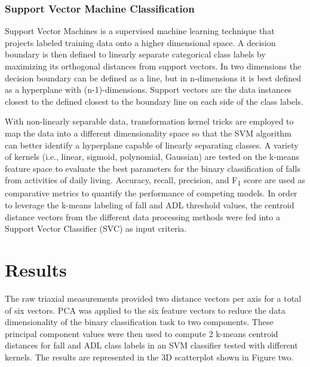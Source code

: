\documentclass{llncs}
\begin{document}
\subsubsection{Support Vector Machine Classification} 
	Support Vector Machines is a supervised machine learning technique that projects labeled training data onto a higher dimensional space. A decision boundary is then defined to linearly separate categorical class labels by maximizing its orthogonal distances from support vectors. In two dimensions the decision boundary can be defined as a line, but in n-dimensions it is best defined as a hyperplane with (n-1)-dimensions. Support vectors are the data instances closest to the defined closest to the boundary line on each side of the class labels. 

	With non-linearly separable data, transformation kernel tricks are employed to map the data into a different dimensionality space so that the SVM algorithm can better identify a hyperplane capable of linearly separating classes. A variety of kernels (i.e., linear, sigmoid, polynomial, Gaussian) are tested on the k-means feature space to evaluate the best parameters for the binary classification of falls from activities of daily living. Accuracy, recall, precision, and F\textsubscript{1} score are used as comparative metrics to quantify the performance of competing models. In order to leverage the k-means labeling of fall and ADL threshold values, the centroid distance vectors from the different data processing methods were fed into a Support Vector Classifier (SVC) as input criteria.


    
\section{Results}

The raw triaxial measurements provided two distance vectors per axis for a total of six vectors. PCA was applied to the six feature vectors to reduce the data dimensionality of the binary classification task to two components. These principal component values were then used to compute 2 k-means centroid distances for fall and ADL class labels in an SVM classifier tested with different kernels. The results are represented in the 3D scatterplot shown in Figure two.
\end{document}
